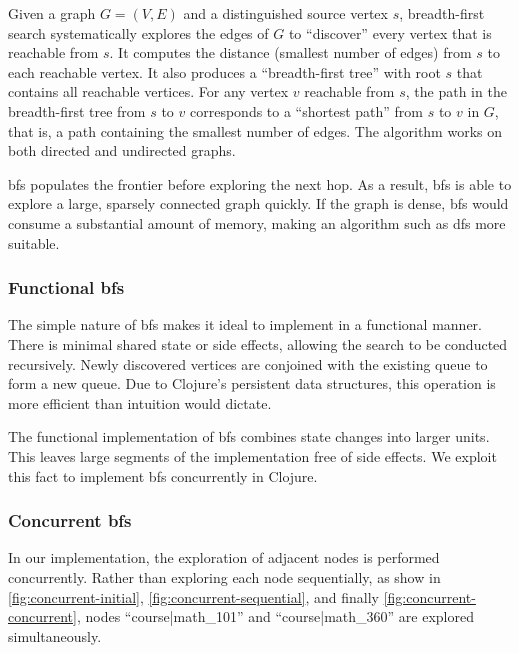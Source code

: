 			\begin{displayquote}
				Given a graph \(G = (V, E)\) and a distinguished source vertex \(s\), breadth-first search systematically explores the edges of \(G\) to ``discover'' every vertex that is reachable from \(s\). It computes the distance (smallest number of edges) from \(s\) to each reachable vertex. It also produces a ``breadth-first tree'' with root \(s\) that contains all reachable vertices. For any vertex \(v\) reachable from \(s\), the path in the breadth-first tree from \(s\) to \(v\) corresponds to a ``shortest path'' from \(s\) to \(v\) in \(G\), that is, a path containing the smallest number of edges. The algorithm works on both directed and undirected graphs.
			\end{displayquote}
			
			\gls{bfs} populates the frontier before exploring the next hop.  As a result, \gls{bfs} is able to explore a large, sparsely connected graph quickly.  If the graph is dense, \gls{bfs} would consume a substantial amount of memory, making an algorithm such as \gls{dfs} more suitable.
			
		\subsubsection{Functional \gls{bfs}}
			The simple nature of \gls{bfs} makes it ideal to implement in a functional manner.  There is minimal shared state or side effects, allowing the search to be conducted recursively.  Newly discovered vertices are conjoined with the existing queue to form a new queue.  Due to Clojure's persistent data structures, this operation is more efficient than intuition would dictate.
			
			The functional implementation of \gls{bfs} combines state changes into larger units.  This leaves large segments of the implementation free of side effects.  We exploit this fact to implement \gls{bfs} concurrently in Clojure.
		
		\subsubsection{Concurrent \gls{bfs}}
			In our implementation, the exploration of adjacent nodes is performed concurrently.  Rather than exploring each node sequentially, as show in \cref{fig:concurrent-initial}, \cref{fig:concurrent-sequential}, and finally \cref{fig:concurrent-concurrent}, nodes ``course|math\_101'' and ``course|math\_360'' are explored simultaneously.
			
